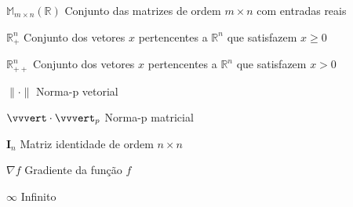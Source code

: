 \documentclass[
	oldfontcommands,
	sumario=tradicional,
	12pt,			%
	openright,		%
	oneside,		%
	a4paper,		%
	english,		%
	english			%
	]{imecc-unicamp}
\begin{document}
\begin{simbolos}
  \item[$ \mathds{M}_{m\times n}(\mathds{R}) $] Conjunto das matrizes de ordem $m\times n$ com entradas reais
  \item[$ \mathds{R}^n_+ $] Conjunto dos vetores $x$ pertencentes a $\mathds{R}^n$ que satisfazem $x\geq0$
  \item[$ \mathds{R}^n_{++} $] Conjunto dos vetores $x$ pertencentes a $\mathds{R}^n$ que satisfazem $x>0$
  \item[$\|\cdot\|$] Norma-p vetorial
  \item[$\vvvert\cdot\vvvert_p$] Norma-p matricial
  \item[$\mathbf{I}_n$] Matriz identidade de ordem $n \times n$
  \item[$\nabla f$] Gradiente da função $f$
  \item[$\infty$] Infinito
\end{simbolos}
\listofalgorithms
\cleardoublepage
\begin{KeepFromToc}
\lstlistoflistings
\end{KeepFromToc}
\cleardoublepage
\tableofcontents*
\cleardoublepage
\textual

\end{document}

